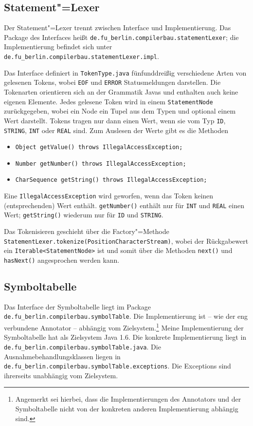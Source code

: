 \documentclass[10pt,a4paper,ngerman,titlepage,tocindentauto]{scrartcl}
\newcommand{\n}{\linebreak[1]}
\begin{document}
		\subsection{Statement"=Lexer}
			Der Statement"=Lexer trennt zwischen Interface und Implementierung.
			Das Package des Interfaces heißt \texttt{de.{\n}fu\_berlin.{\n}compilerbau.{\n}statementLexer};
			die Implementierung befindet sich unter \texttt{de.{\n}fu\_berlin.{\n}compilerbau.{\n}statement\-Lexer.{\n}impl}.
			
			Das Interface definiert in \texttt{TokenType.java} fünfunddreißig verschiedene Arten von gelesenen Tokens,
			wobei \texttt{EOF} und \texttt{ERROR} Statusmeldungen darstellen. Die Tokenarten orientieren sich
			an der Grammatik Javas und enthalten auch keine eigenen Elemente. Jedes gelesene Token wird in einem
			\texttt{StatementNode} zurückgegeben, wobei ein Node ein Tupel aus dem Typen und optional einem Wert
			darstellt.
			Tokens tragen nur dann einen Wert, wenn sie vom Typ \texttt{ID}, \texttt{STRING}, \texttt{INT} oder
			\texttt{REAL} sind. Zum Auslesen der Werte gibt es die Methoden
			\begin{itemize}
				\item \texttt{Object getValue() throws IllegalAccessException;}
				\item \texttt{Number getNumber() throws IllegalAccessException;}
				\item \texttt{CharSequence getString() throws IllegalAccessException;}
			\end{itemize}
			Eine \texttt{IllegalAccessException} wird geworfen, wenn das Token keinen (entsprechenden)
			Wert enthält. \texttt{getNumber()} enthält nur für \texttt{INT} und \texttt{REAL} einen Wert;
			\texttt{getString()} wiederum nur für \texttt{ID} und \texttt{STRING}.
			
			Das Tokenisieren geschieht über die Factory"=Methode \texttt{StatementLexer.tokenize(Position\-Character\-Stream)},
			wobei der Rückgabewert ein \texttt{Iterable<StatementNode>} ist und somit über die Methoden \texttt{next()} und
			\texttt{hasNext()} angesprochen werden kann.
	
		\subsection{Symboltabelle}
			Das Interface der Symboltabelle liegt im Package \texttt{de.{\n}fu\_berlin.{\n}compilerbau.{\n}symbolTable}.
			Die Implementierung ist -- wie der eng verbundene Annotator -- abhängig vom Zielsystem.\footnote
			{Angemerkt sei hierbei, dass die Implementierungen des Annotators und der Symboltabelle nicht von
			der konkreten anderen Implementierung abhängig sind.}
			Meine Implementierung der Symboltabelle hat als Zielsystem Java 1.6. Die konkrete Implementierung
			liegt in \texttt{de.{\n}fu\_berlin.{\n}compilerbau.{\n}symbolTable.{\n}java}. Die Ausnahmebehandlungsklassen
			liegen in \texttt{de.{\n}fu\_berlin.{\n}compilerbau.{\n}symbolTable.{\n}exceptions}. Die Exceptions sind
			ihrerseits unabhängig vom Zielsystem.
			
\end{document}
